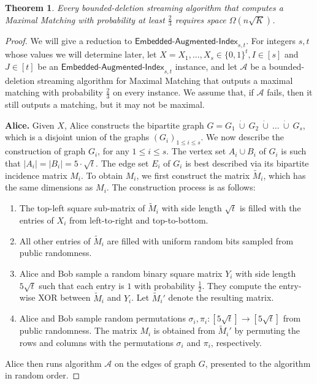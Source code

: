 \documentclass[11pt,a4paper]{article}
\newtheorem{theorem}{Theorem}
\begin{document}
\begin{theorem}
    Every bounded-deletion streaming algorithm that computes a \textsf{Maximal Matching} with probability at least $\frac{2}{3}$ requires space $\Omega( n \sqrt{K})$.
\end{theorem}
\setcounter{theorem}{\value{thmsaved}}
\addtocounter{theorem}{-1}
\begin{proof}
We will give a reduction to $\textsf{Embedded-Augmented-Index}_{s,t}$. For integers $s,t$ whose  values we will determine later, let $X = X_1, \dots, X_s \in \{0, 1\}^t, I \in [s]$ and $ J \in [t]$ be an $\textsf{Embedded-Augmented-Index}_{s,t}$ instance, and let $\mathcal{A}$ be a bounded-deletion streaming algorithm for \textsf{Maximal Matching} that outputs a maximal matching with probability $\frac{2}{3}$ on every instance. We assume that, if $\mathcal{A}$ fails, then it still outputs a matching, but it may not be maximal.


\vspace{0.1cm}
\noindent \textbf{Alice.} Given $X$, Alice constructs the bipartite graph $G=G_1 \ \dot{\cup} \ G_2 \  \dot{\cup} \ \dots \  \dot{\cup} \ G_s$, which is a disjoint union of the graphs $(G_i)_{1 \le i \le s}$. We now describe the construction of graph $G_i$, for any $ 1 \le i \le s$. The vertex set $A_i \cup B_i$ of $G_i$ is such that $|A_i| = |B_i| = 5 \cdot \sqrt{t}$. The edge set $E_i$ of $G_i$ is best described via its bipartite incidence matrix $M_i$. To obtain $M_i$, we first construct the matrix $\tilde{M}_i$, which has the same dimensions as $M_i$. The construction process is as follows:
\begin{enumerate}
    \item The top-left square sub-matrix of $\tilde{M}_i$ with side length $\sqrt{t}$ is filled with the entries of $X_i$ from left-to-right and top-to-bottom.
    \item All other entries of $\tilde{M}_i$ are filled with uniform random bits sampled from public randomness.
    \item Alice and Bob sample a random binary square matrix $Y_i$ with side length $5 \sqrt{t}$ such that each entry is $1$ with probability $\frac{1}{2}$. They compute the entry-wise XOR between $\tilde{M}_i$ and $Y_i$. Let $\tilde{M}_i'$ denote the resulting matrix.
    \item Alice and Bob sample random permutations $\sigma_i, \pi_i: [5 \sqrt{t}] \rightarrow [5 \sqrt{t}]$ from public randomness. The matrix $M_i$ is obtained from $\tilde{M}_i'$ by permuting the rows and columns with the permutations $\sigma_i$ and $\pi_i$, respectively.
\end{enumerate}
Alice then runs algorithm $\mathcal{A}$ on the edges of graph $G$, presented to the algorithm in random order.


\end{proof}
\end{document}
